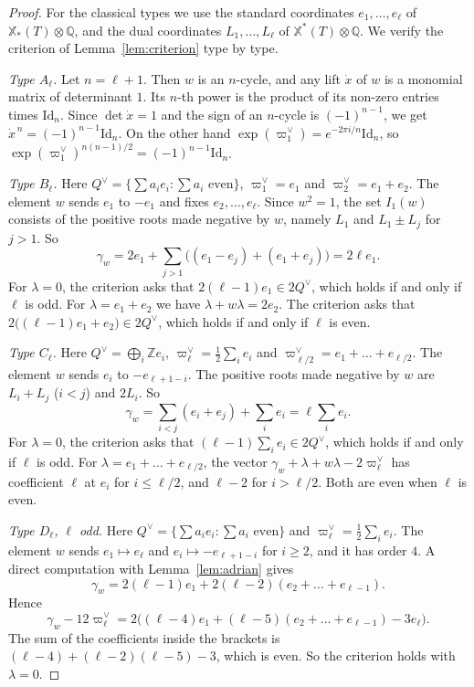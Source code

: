 \documentclass[psamsfonts]{amsart}
\theoremstyle{definition}
\theoremstyle{remark}
\numberwithin{equation}{section}
\newcommand{\Z}{\mathbb{Z}}   %
\newcommand{\Q}{\mathbb{Q}}
\newcommand{\X}{\mathbb{X}}
\numberwithin{equation}{section}
\newcommand{\Id}{\mathrm{Id}}
\theoremstyle{plain}
\begin{document}
\begin{proof}
For the classical types we use the standard coordinates $e_1,\dots,e_\ell$ of $\X_*(T)\otimes\Q$, and the dual coordinates $L_1,\dots,L_\ell$ of $\X^*(T)\otimes\Q$. We verify the criterion of Lemma~\ref{lem:criterion} type by type.

\emph{Type $A_\ell$.} Let $n=\ell+1$. Then $w$ is an $n$-cycle, and any lift $\dot x$ of $w$ is a monomial matrix of determinant $1$. Its $n$-th power is the product of its non-zero entries times $\Id_n$. Since $\det\dot x=1$ and the sign of an $n$-cycle is $(-1)^{n-1}$, we get $\dot x^{\,n}=(-1)^{n-1}\Id_n$. On the other hand $\exp(\varpi_1^\vee)=e^{-2\pi i/n}\Id_n$, so $\exp(\varpi_1^\vee)^{n(n-1)/2}=(-1)^{n-1}\Id_n$.

\emph{Type $B_\ell$.} Here $Q^\vee=\{\sum a_ie_i:\sum a_i\text{ even}\}$, $\varpi_1^\vee=e_1$ and $\varpi_2^\vee=e_1+e_2$. The element $w$ sends $e_1$ to $-e_1$ and fixes $e_2,\dots,e_\ell$. Since $w^2=1$, the set $I_1(w)$ consists of the positive roots made negative by $w$, namely $L_1$ and $L_1\pm L_j$ for $j>1$. So
\[
\gamma_w=2e_1+\sum_{j>1}\big((e_1-e_j)+(e_1+e_j)\big)=2\ell e_1.
\]
For $\lambda=0$, the criterion asks that $2(\ell-1)e_1\in2Q^\vee$, which holds if and only if $\ell$ is odd. For $\lambda=e_1+e_2$ we have $\lambda+w\lambda=2e_2$. The criterion asks that $2\big((\ell-1)e_1+e_2\big)\in2Q^\vee$, which holds if and only if $\ell$ is even.

\emph{Type $C_\ell$.} Here $Q^\vee=\bigoplus_i\Z e_i$, $\varpi_\ell^\vee=\frac12\sum_ie_i$ and $\varpi_{\ell/2}^\vee=e_1+\dots+e_{\ell/2}$. The element $w$ sends $e_i$ to $-e_{\ell+1-i}$. The positive roots made negative by $w$ are $L_i+L_j$ ($i<j$) and $2L_i$. So
\[
\gamma_w=\sum_{i<j}(e_i+e_j)+\sum_ie_i=\ell\sum_ie_i.
\]
For $\lambda=0$, the criterion asks that $(\ell-1)\sum_ie_i\in2Q^\vee$, which holds if and only if $\ell$ is odd. For $\lambda=e_1+\dots+e_{\ell/2}$, the vector $\gamma_w+\lambda+w\lambda-2\varpi_\ell^\vee$ has coefficient $\ell$ at $e_i$ for $i\leq\ell/2$, and $\ell-2$ for $i>\ell/2$. Both are even when $\ell$ is even.

\emph{Type $D_\ell$, $\ell$ odd.} Here $Q^\vee=\{\sum a_ie_i:\sum a_i\text{ even}\}$ and $\varpi_\ell^\vee=\frac12\sum_ie_i$. The element $w$ sends $e_1\mapsto e_\ell$ and $e_i\mapsto-e_{\ell+1-i}$ for $i\geq2$, and it has order $4$. A direct computation with Lemma~\ref{lem:adrian} gives
\[
\gamma_w=2(\ell-1)e_1+2(\ell-2)(e_2+\dots+e_{\ell-1}).
\]
Hence
\[
\gamma_w-12\varpi_\ell^\vee=2\big((\ell-4)e_1+(\ell-5)(e_2+\dots+e_{\ell-1})-3e_\ell\big).
\]
The sum of the coefficients inside the brackets is $(\ell-4)+(\ell-2)(\ell-5)-3$, which is even. So the criterion holds with $\lambda=0$.


\end{proof}
\end{document}

